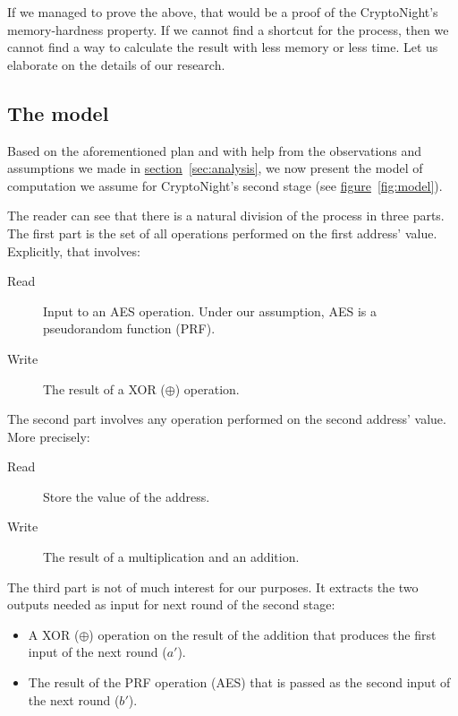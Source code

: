 If we managed to prove the above, that would be a proof of the CryptoNight's memory-hardness property. If we cannot find a shortcut for the process, then we cannot find a way to calculate the result with less memory or less time. Let us elaborate on the details of our research.

\subsection{The model}
Based on the aforementioned plan and with help from the observations and assumptions we made in \hyperref[sec:analysis]{section}~\ref{sec:analysis}, we now present the model of computation we assume for CryptoNight's second stage (see \hyperref[fig:model]{figure}~\ref{fig:model}).

The reader can see that there is a natural division of the process in three parts. The first part is the set of all operations performed on the first address' value. Explicitly, that involves:
\begin{description}
  \item [Read] Input to an AES operation. Under our assumption, AES is a pseudorandom function (PRF).
  \item [Write] The result of a XOR ($\oplus$) operation.
\end{description}

The second part involves any operation performed on the second address' value. More precisely:
\begin{description}
  \item [Read] Store the value of the address.
  \item [Write] The result of a multiplication and an addition.
\end{description}

The third part is not of much interest for our purposes. It extracts the two outputs needed as input for next round of the second stage:
\begin{itemize}
  \item A XOR ($\oplus$) operation on the result of the addition that produces the first input of the next round ($a'$).
  \item The result of the PRF operation (AES) that is passed as the second input of the next round ($b'$).
\end{itemize}
\clearpage

